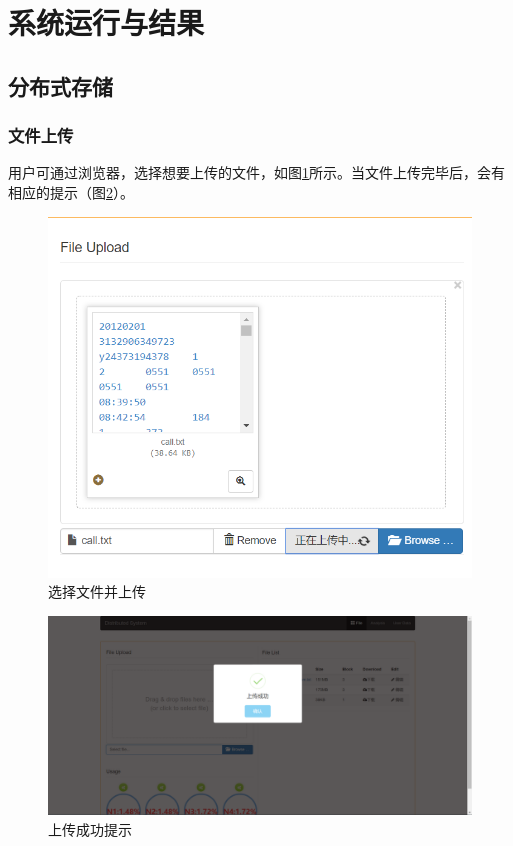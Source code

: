 \documentclass[12pt,a4paper]{article}
\begin{document}
\section{系统运行与结果}
\subsection{分布式存储}

\subsubsection{文件上传}
用户可通过浏览器，选择想要上传的文件，如图\ref{upload_1}所示。当文件上传完毕后，会有相应的提示（图\ref{upload_2}）。
\begin{figure}[htb]
\centering
\includegraphics[width=14cm]{upload_1}
\caption{选择文件并上传 \label{upload_1}}
\end{figure}
\begin{figure}[htb]
\centering
\includegraphics[width=14cm]{upload_2}
\caption{上传成功提示 \label{upload_2}}
\end{figure}
\end{document}
